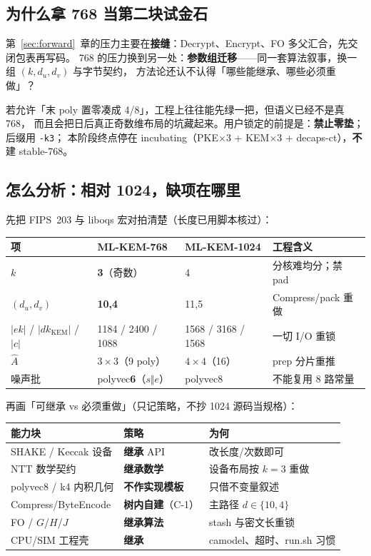 \documentclass[UTF8,a4paper,11pt]{ctexart}
\theoremstyle{definition}
\theoremstyle{plain}
\theoremstyle{remark}
\numberwithin{figure}{section}
\numberwithin{table}{section}
\begin{document}
\subsection{为什么拿 768 当第二块试金石}
\label{sec:mlkem768-why}

第~\ref{sec:forward}~章的压力主要在\textbf{接缝}：Decrypt、Encrypt、FO 多父汇合，先交闭包表再写码。
768 的压力换到另一处：\textbf{参数组迁移}——同一套算法叙事，换一组 $(k,d_u,d_v)$ 与字节契约，
方法论还认不认得「哪些能继承、哪些必须重做」？

若允许「末 poly 置零凑成 4/8」，工程上往往能先绿一把，但语义已经不是真 768，
而且会把日后真正奇数维布局的坑藏起来。用户锁定的前提是：\textbf{禁止零垫}；后缀用 \texttt{-k3}；
本阶段终点停在 incubating（PKE$\times$3 + KEM$\times$3 + decaps-ct），\textbf{不}建 stable-768。

\subsection{怎么分析：相对 1024，缺项在哪里}
\label{sec:mlkem768-analysis}

先把 FIPS~203 与 liboqs 宏对拍清楚（长度已用脚本核过）：

\begin{center}
\small
\begin{tabular}{@{}L{3.2cm}L{3.2cm}L{3.2cm}L{3.6cm}@{}}
  \toprule
  项 & ML-KEM-768 & ML-KEM-1024 & 工程含义 \\
  \midrule
  $k$ & \textbf{3}（奇数） & 4 & 分核难均分；禁 pad \\
  $(d_u,d_v)$ & \textbf{10,4} & 11,5 & Compress/pack 重做 \\
  $|ek|$ / $|dk_{\mathrm{KEM}}|$ / $|c|$ & 1184 / 2400 / 1088 & 1568 / 3168 / 1568 & 一切 I/O 重锁 \\
  $\hat A$ & $3\times3$（9 poly） & $4\times4$（16） & prep 分片重推 \\
  噪声批 & polyvec\textbf{6}（$s\Vert e$） & polyvec8 & 不能复用 8 路常量 \\
  \bottomrule
\end{tabular}
\end{center}

再画「可继承 vs 必须重做」（只记策略，不抄 1024 源码当规格）：

\begin{center}
\small
\begin{tabular}{@{}L{3.4cm}L{4.2cm}L{5.6cm}@{}}
  \toprule
  能力块 & 策略 & 为何 \\
  \midrule
  SHAKE / Keccak 设备 & \textbf{继承} API & 改长度/次数即可 \\
  NTT 数学契约 & \textbf{继承数学} & 设备布局按 $k=3$ 重做 \\
  polyvec8 / k4 内积几何 & \textbf{不作实现模板} & 只借不变量叙述 \\
  Compress/ByteEncode & \textbf{树内自建}（C-1） & 主路径 $d\in\{10,4\}$ \\
  FO / $G$/$H$/$J$ & \textbf{继承算法} & stash 与密文长重锁 \\
  CPU/SIM 工程壳 & \textbf{继承} & camodel、超时、run.sh 习惯 \\
  \bottomrule
\end{tabular}
\end{center}
\end{document}
